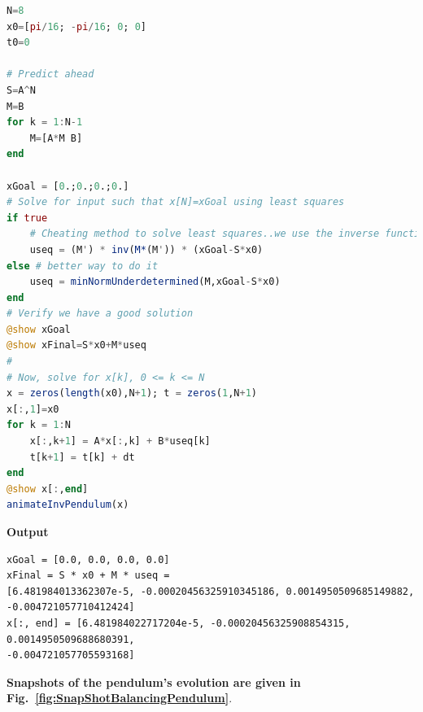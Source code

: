








\begin{lstlisting}[language=Julia,style=mystyle]
N=8
x0=[pi/16; -pi/16; 0; 0]
t0=0

# Predict ahead
S=A^N
M=B
for k = 1:N-1
    M=[A*M B]
end

xGoal = [0.;0.;0.;0.]
# Solve for input such that x[N]=xGoal using least squares
if true
    # Cheating method to solve least squares..we use the inverse function :( oh no....
    useq = (M') * inv(M*(M')) * (xGoal-S*x0)
else # better way to do it
    useq = minNormUnderdetermined(M,xGoal-S*x0)
end
# Verify we have a good solution
@show xGoal
@show xFinal=S*x0+M*useq
#
# Now, solve for x[k], 0 <= k <= N
x = zeros(length(x0),N+1); t = zeros(1,N+1)
x[:,1]=x0
for k = 1:N
    x[:,k+1] = A*x[:,k] + B*useq[k]
    t[k+1] = t[k] + dt
end
@show x[:,end]
animateInvPendulum(x)
\end{lstlisting}
\textbf{Output} 
\begin{verbatim}
xGoal = [0.0, 0.0, 0.0, 0.0]
xFinal = S * x0 + M * useq = 
[6.481984013362307e-5, -0.00020456325910345186, 0.0014950509685149882, -0.004721057710412424]
x[:, end] = [6.481984022717204e-5, -0.00020456325908854315, 0.0014950509688680391,
-0.004721057705593168]
\end{verbatim}


\textbf{Snapshots of the pendulum's evolution are given in Fig.~\ref{fig:SnapShotBalancingPendulum}}.

\vspace*{.6cm}

